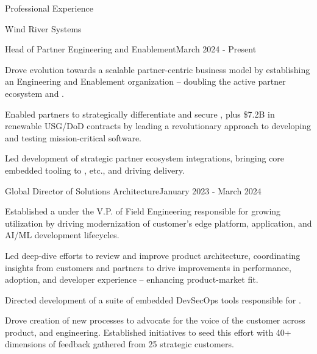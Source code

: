 \documentclass{resume} %
\begin{document}
\begin{rSection}{Professional Experience}

  \begin{rCompany}{Wind River Systems}{}{}
    \begin{rRole}{Head of Partner Engineering and Enablement}{}{March 2024 - Present}
      \item Drove evolution towards a scalable partner-centric business model by establishing an Engineering and Enablement organization -- doubling the active partner ecosystem and .
      \item Enabled partners to strategically differentiate and secure , plus \$7.2B in renewable USG/DoD contracts by leading a revolutionary approach to developing and testing mission-critical software.
      \item Led development of strategic partner ecosystem integrations, bringing core embedded tooling to , etc., and driving  delivery.
    \end{rRole}
    
    \begin{rRole}{Global Director of Solutions Architecture}{}{January 2023 - March 2024}
      \item Established a  under the V.P. of Field Engineering responsible for growing utilization by driving modernization of customer's edge platform, application, and AI/ML development lifecycles.
      \item Led deep-dive efforts to review and improve product architecture, coordinating insights from customers and partners to drive improvements in performance, adoption, and developer experience -- enhancing product-market fit.
      \item Directed development of a suite of embedded DevSecOps tools responsible for .
      \item Drove creation of new processes to advocate for the voice of the customer across product, and engineering. Established initiatives to seed this effort with 40+ dimensions of feedback gathered from 25 strategic customers.
    \end{rRole}
  \end{rCompany}


\end{rSection}
\end{document}

